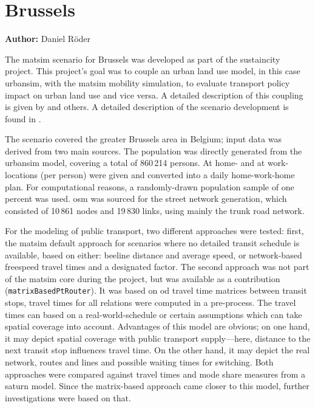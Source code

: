 \chapter{Brussels}
\label{ch:brussels}
\hfill \textbf{Author:} Daniel Röder


The \gls{matsim} scenario for Brussels was developed as part of the \gls{sustaincity} project. This project's goal was to couple an urban land use model, in this case \gls{urbansim}, with the \gls{matsim} mobility simulation, to evaluate transport policy impact on urban land use and vice versa. A detailed description of this coupling is given by \citet{Nicolai2013PhD} and others. A detailed description of the scenario development is found in \citet{RoederNagel2013SketchPlanningBrussels}.

The scenario covered the greater Brussels area in Belgium; input data was derived from two main sources. The population was directly generated from the \gls{urbansim} model, covering a total of 860\,214 persons. At home- and at work-locations (per person) were given and converted into a daily home-work-home plan. For computational reasons, a randomly-drawn population sample of one percent was used. \gls{osm} was sourced for the street network generation, which consisted of 10\,861 nodes and 19\,830 links, \ie using mainly the trunk road network.

For the modeling of public transport, two different approaches were tested:  first, the \gls{matsim} default approach for scenarios where no detailed transit schedule is available, based on either: beeline distance and average speed, or network-based freespeed travel times and a designated factor. The second approach was not part of the \gls{matsim} core during the project, but was available as a contribution (\lstinline|matrixBasedPtRouter|). It was based on \gls{od} travel time matrices between transit stops, \ie travel times for all relations were computed in a pre-process. The travel times can based on a real-world-schedule or certain assumptions which can take spatial coverage into account. Advantages of this model are obvious; on one hand, it may depict spatial coverage with public transport supply---here, distance to the next transit stop influences travel time. On the other hand, it may depict the real network, \ie routes and lines and possible waiting times for switching. Both approaches were compared against travel times and mode share measures from a \gls{saturn} model. Since the matrix-based approach came closer to this model, further investigations were based on that.

